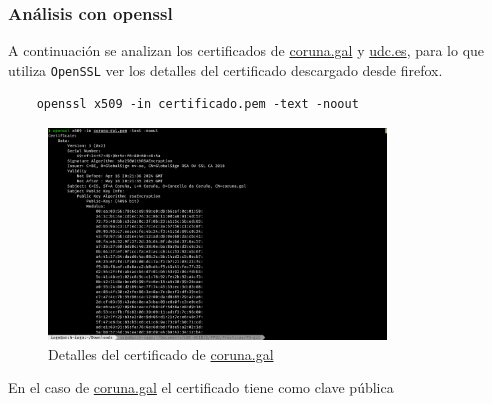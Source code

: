 \subsubsection{Análisis con openssl}

A continuación se analizan los certificados de \url{coruna.gal} y \url{udc.es}, para lo que utiliza \texttt{OpenSSL} ver los detalles del certificado descargado desde firefox.

\begin{verbatim}
    openssl x509 -in certificado.pem -text -noout
\end{verbatim}

\begin{figure}[H]
    \centering
    \includegraphics[width=0.8\textwidth]{openssl-coruna.png}
    \caption{Detalles del certificado de \url{coruna.gal}}
\end{figure}

En el caso de \url{coruna.gal} el certificado tiene como clave pública

